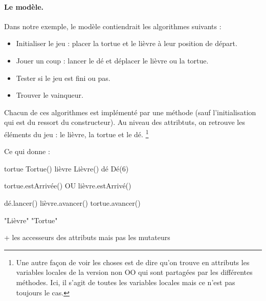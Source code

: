 		\paragraph{Le modèle.}
		Dans notre exemple, le modèle contiendrait les algorithmes suivants :
		\begin{itemize}
		\item
			Initialiser le jeu : 
			placer la tortue et le lièvre à leur position de départ.
		\item
			Jouer un coup : 
			lancer le dé et déplacer le lièvre ou la tortue.
		\item
			Tester si le jeu est fini ou pas.
		\item
			Trouver le vainqueur.
		\end{itemize}

		Chacun de ces algorithmes est implémenté par une méthode
		(sauf l'initialisation qui est du ressort du constructeur).
		Au niveau des attribtuts, 
		on retrouve les éléments du jeu : le lièvre, la tortue et le dé.
		\footnote{%
			Une autre façon de voir les choses
			est de dire qu'on trouve en attributs
			les variables locales de la version non OO
			qui sont partagées par les différentes méthodes.
			Ici, il s'agit de toutes les variables locales
			mais ce n'est pas toujours le cas.
		}
		
		Ce qui donne :
		\begin{LDA}
				\Private
				\Public
						\Let tortue \Gets {} Tortue()
						\Let lièvre \Gets {} Lièvre()
						\Let dé \Gets {} Dé(6)						
					\EndConstr				
					
					\Empty
						\Return tortue.estArrivée() OU lièvre.estArrivé()
					\EndMethod

					\Empty
						\Stmt dé.lancer()
							\Stmt lièvre.avancer()
						\Else
							\Stmt tortue.avancer()
						\EndIf
					\EndMethod
	
					\Empty
							\Return "Lièvre"
						\Else
							\Return "Tortue"
						\EndIf
					\EndMethod
					
					\Empty
					\LComment
						+ les accesseurs des attributs mais pas les mutateurs
			\EndClass
		\end{LDA}
			
